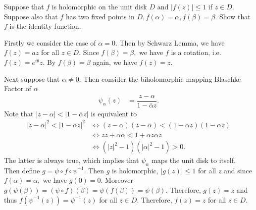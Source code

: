 \begin{problem}
Suppose that $f$ is holomorphic on the unit disk $D$ and $|f(z)|\le 1$ if $z\in D.$ Suppose also that $f$ has two fixed points in $D, f(\alpha)=\alpha, f(\beta)=\beta.$ Show that $f$ is the identity function.
\begin{solution}
Firstly we consider the case of $\alpha=0.$ Then by Schwarz Lemma, we have $f(z)=az$ for all $z\in D.$ Since $f(\beta)=\beta,$ we have $f$ is a rotation, i.e. $f(z)=e^{i\theta}z.$ By $f(\beta)=\beta$ again, we have $f(z)=z.$
 
Next suppose that $\alpha\ne 0.$ Then consider the biholomorphic mapping Blaschke Factor of $\alpha$
\begin{align*}
    \psi_\alpha(z)&=\dfrac{z-\alpha}{1-\bar \alpha z}.
\end{align*}
Note that $|z-\alpha|<|1-\bar \alpha z|$ is equivalent to 
\begin{align*}
    |z-\alpha|^2<|1-\bar \alpha z|^2 &\iff (z-\alpha)(\bar z-\bar \alpha) < (1-\bar \alpha z)(1- \alpha \bar z) \\
    &\iff z\bar z+\alpha \bar \alpha<1+\alpha z\bar \alpha\bar z \\
    &\iff (|z|^2-1)(|\alpha|^2-1) > 0.
\end{align*}
The latter is always true, which implies that $\psi_\alpha$ maps the unit disk to itself. Then define $g=\psi\circ f\circ \psi^{-1}$. Then $g$ is holomorphic, $|g(z)|\le 1$ for all $z$ and since $f(\alpha)=\alpha,$ we have $g(0)=0.$ Moreover $g(\psi(\beta))=(\psi \circ f)(\beta)=\psi(f(\beta))=\psi(\beta).$ Therefore, $g(z)=z$ and thus $f(\psi^{-1}(z))=\psi^{-1}(z)$ for all $z\in D.$ Therefore, $f(z)=z$ for all $z\in D.$
\end{solution}
\end{problem}

